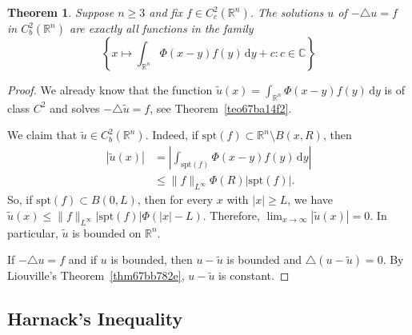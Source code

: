 \documentclass[a4paper,9pt]{amsart}
\newcommand{\R}{\mathbb{R}}	%
\newcommand{\C}{\mathbb{C}}	%
\newcommand{\did}{\,\mathrm{d}}	%
\newcommand{\spt}{\mathrm{spt}}
\newcommand{\laplacian}{\triangle}
\theoremstyle{plain}
\newtheorem{theorem}[proposition]{Theorem}
\theoremstyle{definition}
\theoremstyle{remark}
\begin{document}
\begin{theorem}
	Suppose $n\ge3$ and fix $f\in C^2_c(\R^n)$.
	The solutions $u$ of $-\laplacian u=f$ in $C^2_b(\R^n)$ are exactly all functions in the family
	\begin{equation}
		\left\{ x\mapsto \int_{\R^n} \Phi(x-y) f(y) \did y + c : c\in \C \right\}
	\end{equation}
	
\end{theorem}
\begin{proof}
	We already know that the function $\tilde u(x) = \int_{\R^n} \Phi(x-y) f(y) \did y$ 
	is of class $C^2$ and solves $-\laplacian\tilde u=f$,
	see Theorem~\ref{teo67ba14f2}.
	
	We claim that $\tilde u\in C^2_b(\R^n)$.
	Indeed, if $\spt(f)\subset \R^n\setminus B(x,R)$, then
	\begin{align*}
		|\tilde u(x)| 
		&= \left| \int_{\spt(f)} \Phi(x-y) f(y) \did y \right| \\
		&\le \|f\|_{L^\infty} \Phi(R) |\spt(f)| .
	\end{align*}
	So, if $\spt(f)\subset B(0,L)$, then for every $x$ with $|x|\ge L$, we have
	$\tilde u(x) \le  \|f\|_{L^\infty}|\spt(f)| \Phi(|x|-L)$.
	Therefore, $\lim_{x\to\infty}|\tilde u(x)| = 0$.
	In particular, $\tilde u$ is bounded on $\R^n$.
	
	If $-\laplacian u=f$ and if $u$ is bounded, then $u-\tilde u$ is bounded and $\laplacian(u-\tilde u)=0$.
	By Liouville's Theorem~\ref{thm67bb782e}, $u-\tilde u$ is constant.
\end{proof}


\subsection{Harnack's Inequality}\label{subs67bb79dd}
\end{document}
